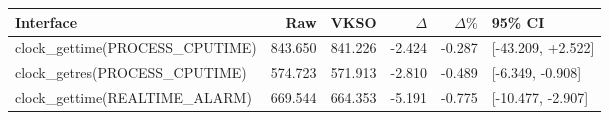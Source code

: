 \begin{tabular}{lrrrrl}
\toprule
Interface & Raw & VKSO & $\Delta$ & $\Delta\%$ & 95\% CI \\
\midrule
clock\_gettime(PROCESS\_CPUTIME) & 843.650 & 841.226 & -2.424 & -0.287 & [-43.209, +2.522] \\
clock\_getres(PROCESS\_CPUTIME) & 574.723 & 571.913 & -2.810 & -0.489 & [-6.349, -0.908] \\
clock\_gettime(REALTIME\_ALARM) & 669.544 & 664.353 & -5.191 & -0.775 & [-10.477, -2.907] \\
\bottomrule
\end{tabular}
